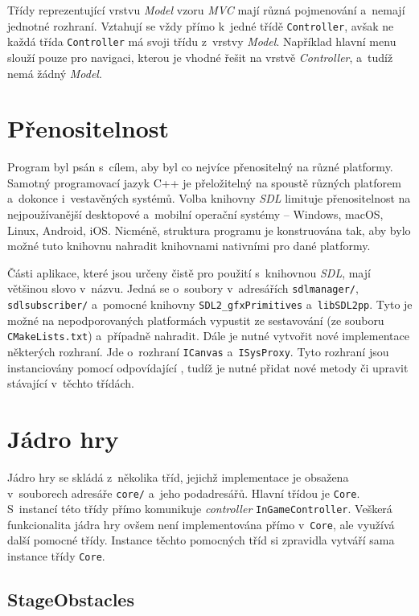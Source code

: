 Třídy reprezentující vrstvu \emph{Model} vzoru \emph{MVC} mají různá pojmenování a~nemají jednotné rozhraní. Vztahují se vždy přímo k~jedné třídě \texttt{Controller}, avšak ne každá třída \texttt{Controller} má svoji třídu z~vrstvy \emph{Model}. Například hlavní menu slouží pouze pro navigaci, kterou je vhodné řešit na vrstvě \emph{Controller}, a~tudíž nemá žádný \emph{Model}.


\section{Přenositelnost}

Program byl psán s~cílem, aby byl co nejvíce přenositelný na různé platformy. Samotný programovací jazyk C++ je přeložitelný na spoustě různých platforem a~dokonce i~vestavěných systémů. Volba knihovny \emph{SDL} limituje přenositelnost na nejpoužívanější desktopové a~mobilní operační systémy -- Windows, macOS, Linux, Android, iOS. Nicméně, struktura programu je konstruována tak, aby bylo možné tuto knihovnu nahradit knihovnami nativními pro dané platformy.

Části aplikace, které jsou určeny čistě pro použití s~knihovnou \emph{SDL}, mají většinou slovo  v~názvu. Jedná se o~soubory v~adresářích \texttt{sdlmanager/}, \texttt{sdlsubscriber/} a~pomocné knihovny \texttt{SDL2\_gfxPrimitives} a~\texttt{libSDL2pp}. Tyto je možné na nepodporovaných platformách vypustit ze sestavování (ze souboru \texttt{CMakeLists.txt}) a~případně nahradit. Dále je nutné vytvořit nové implementace některých rozhraní. Jde o~rozhraní \texttt{ICanvas} a~\texttt{ISysProxy}. Tyto rozhraní jsou instanciovány pomocí odpovídající , tudíž je nutné přidat nové metody či upravit stávající v~těchto třídách.


\section{Jádro hry}
\label{sec:jadro-hry}

Jádro hry se skládá z~několika tříd, jejichž implementace je obsažena v~souborech adresáře \texttt{core/} a~jeho podadresářů. Hlavní třídou je \texttt{Core}. S~instancí této třídy přímo komunikuje \emph{controller} \texttt{InGameController}. Veškerá funkcionalita jádra hry ovšem není implementována přímo v~\texttt{Core}, ale využívá další pomocné třídy. Instance těchto pomocných tříd si zpravidla vytváří sama instance třídy \texttt{Core}.

\subsection*{StageObstacles}

